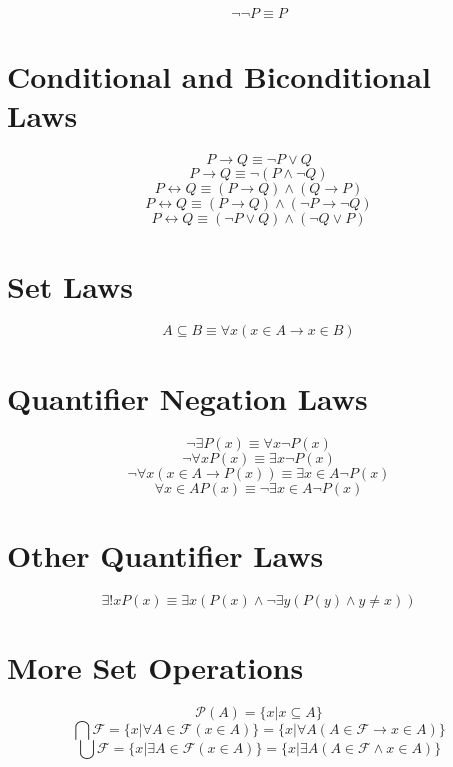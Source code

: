 \documentclass[11pt]{article}
\newcommand{\then}{\rightarrow}
\newcommand{\bicond}{\leftrightarrow}
\newcommand{\powerset}[1]{\mathscr{P}(#1)}
\newcommand{\family}{\mathcal{F}}
\begin{document}
$$\neg \neg P \equiv P$$

\section{Conditional and Biconditional Laws}

$$P \then Q \equiv \neg P \vee Q$$
$$P \then Q \equiv \neg (P \wedge \neg Q)$$
$$P \bicond Q \equiv (P \then Q) \wedge (Q \then P)$$
$$P \bicond Q \equiv (P \then Q) \wedge (\neg P \then \neg Q)$$
$$P \bicond Q \equiv (\neg P \vee Q) \wedge (\neg Q \vee P)$$

\section{Set Laws}
$$A \subseteq B \equiv \forall x (x \in A \then x \in B)$$

\section{Quantifier Negation Laws}

$$\neg \exists P(x) \equiv \forall x \neg P(x)$$
$$\neg \forall x P(x) \equiv \exists x \neg P(x)$$
$$\neg \forall x (x \in A \then P(x)) \equiv \exists x \in A \neg P(x)$$
$$\forall x \in A P(x) \equiv \neg \exists x \in A \neg P(x)$$

\section{Other Quantifier Laws}

$$\exists! x P(x) \equiv \exists x (P(x) \wedge \neg \exists y (P(y) \wedge y \neq x))$$

\section{More Set Operations}

$$\powerset{A} = \{x | x \subseteq A\}$$
$$\bigcap \family = \{x | \forall A \in \family (x \in A)\} = \{x | \forall A (A \in \family \then x \in A)\}$$
$$\bigcup \family = \{x | \exists A \in \family (x \in A)\} = \{x | \exists A (A \in \family \wedge x \in A)\}$$
\end{document}
